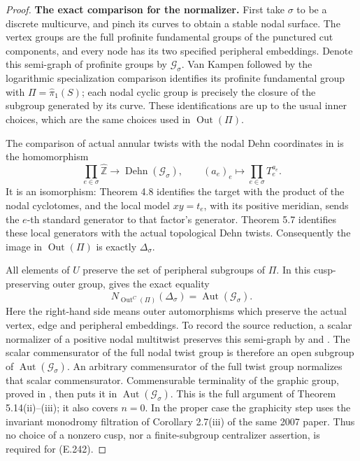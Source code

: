 \begin{proof}
\textbf{The exact comparison for the normalizer.}
First take $\sigma$ to be a discrete multicurve, and pinch
its curves to obtain a stable nodal surface.  The vertex
groups are the full profinite fundamental groups of the
punctured cut components, and every node has its two
specified peripheral embeddings.  Denote this semi-graph
of profinite groups by $\mathcal G_\sigma$.  Van Kampen
followed by the logarithmic specialization comparison
identifies its profinite fundamental group with
$\Pi=\widehat\pi_1(S)$; each nodal cyclic group is precisely
the closure of the subgroup generated by its curve.
These identifications are up to the usual inner choices,
which are the same choices used in $\operatorname{Out}(\Pi)$.

The comparison of actual annular twists with the nodal
Dehn coordinates in
\cite[Theorem 4.8(iv), Theorem 5.7]{ET_HMTopicsI2012}
is the homomorphism
\[
 \prod_{e\in\sigma}\widehat{\mathbb Z}
       \longrightarrow\operatorname{Dehn}(\mathcal G_\sigma),
 \qquad (a_e)_e\longmapsto\prod_{e\in\sigma}T_e^{a_e}.
                                                               \tag{E.241}
\]
It is an isomorphism: Theorem 4.8 identifies the target
with the product of the nodal cyclotomes, and the local
model $xy=t_e$, with its positive meridian, sends the
$e$-th standard generator to that factor's generator.
Theorem 5.7 identifies these local generators with the
actual topological Dehn twists.  Consequently the image
in $\operatorname{Out}(\Pi)$ is exactly $\Delta_\sigma$.

All elements of $U$ preserve the set of peripheral
subgroups of $\Pi$.  In this cusp-preserving outer group,
\cite[Theorem 5.14(iii), pp.~119--121]{ET_HMTopicsI2012}
gives the exact equality
\[
 N_{\operatorname{Out}^{C}(\Pi)}(\Delta_\sigma)
          =\operatorname{Aut}(\mathcal G_\sigma).
                                                               \tag{E.242}
\]
Here the right-hand side means outer automorphisms which
preserve the actual vertex, edge and peripheral embeddings.
To record the source reduction, a scalar normalizer of a
positive nodal multitwist preserves this semi-graph by
\cite[Remark 4.2.1]{ET_HMNodal2011} and
\cite[Corollary 5.9(iii)]{ET_HMTopicsI2012}.
The scalar commensurator of the full nodal twist group is
therefore an open subgroup of
$\operatorname{Aut}(\mathcal G_\sigma)$.
An arbitrary commensurator of the full twist group
normalizes that scalar commensurator.  Commensurable
terminality of the graphic group, proved in
\cite[Corollary 2.7(iv)]{ET_Mochizuki2007CGC}, then puts it
in $\operatorname{Aut}(\mathcal G_\sigma)$.
This is the full argument of Theorem 5.14(ii)--(iii);
it also covers $n=0$.  In the proper case the graphicity
step uses the invariant monodromy filtration of
Corollary 2.7(iii) of the same 2007 paper.
Thus no choice of a nonzero cusp, nor a finite-subgroup
centralizer assertion, is required for (E.242).


\end{proof}
